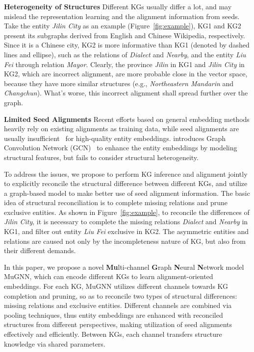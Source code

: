 \documentclass[11pt,a4paper]{article}
\newcommand{\vpara}[1]{\vspace{0.1in}\noindent\textbf{#1 }}
\begin{document}
\vpara{Heterogeneity of Structures} Different KGs usually differ a lot, and may mislead the representation learning and the alignment information from seeds. Take the entity \textit{Jilin City} as an example (Figure~\ref{fig:example}), KG1 and KG2 present its subgraphs derived from English and Chinese Wikipedia, respectively. Since it is a Chinese city, KG2 is more informative than KG1 (denoted by dashed lines and ellipse), such as the relations of \textit{Dialect} and \textit{Nearby}, and the entity \textit{Liu Fei} through relation \textit{Mayor}. Clearly, the province \textit{Jilin} in KG1 and \textit{Jilin City} in KG2, which are incorrect alignment, are more probable close in the vector space, because they have more similar structures (e.g., \textit{Northeastern Mandarin} and \textit{Changchun}). What's worse, this incorrect alignment shall spread further over the graph.

\vpara{Limited Seed Alignments} Recent efforts based on general embedding methods heavily rely on existing alignments as training data, while seed alignments are usually insufficient~\cite{chen2016multilingual} for high-quality entity embeddings. \citet{wang2018cross} introduces Graph Convolution Network (GCN)~\cite{kipf2016semi} to enhance the entity embeddings by modeling structural features, but fails to consider structural heterogeneity.

To address the issues, we propose to perform KG inference and alignment jointly to explicitly reconcile the structural difference between different KGs, and utilize a graph-based model to make better use of seed alignment information. The basic idea of structural reconciliation is to complete missing relations and prune exclusive entities. As shown in Figure~\ref{fig:example}, to reconcile the differences of \textit{Jilin City}, it is necessary to complete the missing relations \textit{Dialect} and \textit{Nearby} in KG1, and filter out entity \textit{Liu Fei} exclusive in KG2. The asymmetric entities and relations are caused not only by the incompleteness nature of KG, but also from their different demands.




In this paper, we propose a novel \textbf{Mu}lti-channel \textbf{G}raph \textbf{N}eural \textbf{N}etwork model MuGNN, which can encode different KGs to learn alignment-oriented embeddings. For each KG, MuGNN utilizes different channels towards KG completion and pruning, so as to reconcile two types of structural differences: missing relations and exclusive entities. Different channels are combined via pooling techniques, thus entity embeddings are enhanced with reconciled structures from different perspectives, making utilization of seed alignments effectively and efficiently. Between KGs, each channel transfers structure knowledge via shared parameters.
\end{document}
